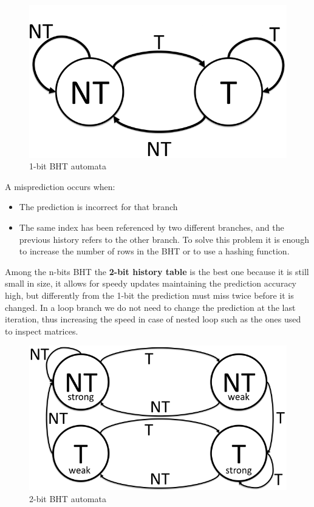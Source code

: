 \begin{figure}[h]
    \centering
    \includegraphics[scale = 0.15]{images/1-bit-BHT-automata}
    \caption{1-bit BHT automata}
    \label{fig:1-bit-BHT-automata}
\end{figure}

A misprediction occurs when:
\begin{itemize}
    \item[\textrightarrow] The prediction is incorrect for that branch
    \item[\textrightarrow] The same index has been referenced by two different branches, and the previous history
    refers to the other branch.
    To solve this problem it is enough to increase the number of rows in the BHT or to use a hashing function.
\end{itemize}

Among the n-bits BHT the \textbf{2-bit history table} is the best one because it is still small in size, it allows for speedy
updates maintaining
the prediction accuracy high, but differently from the 1-bit the prediction must miss twice before it is changed.
In a loop branch we do not need to change the prediction at the last iteration, thus increasing the speed in case of
nested loop such as the ones used to inspect matrices.

\begin{figure}[h]
    \centering
    \includegraphics[scale = 0.2]{images/2-bit-BHT-automata}
    \caption{2-bit BHT automata}
    \label{fig:2-bit-BHT-automata}
\end{figure}

